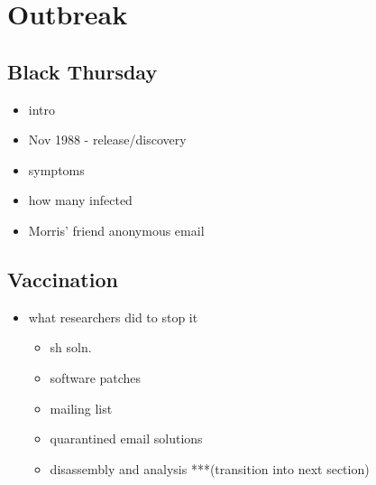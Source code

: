 \section*{Outbreak}

\subsection*{Black Thursday}
\begin{itemize}
    \item intro
	\item Nov 1988 - release/discovery \cite{spafford_crisis_1989}
    \item symptoms
    \item how many infected
    \item Morris' friend anonymous email
\end{itemize}


\subsection*{Vaccination}
\begin{itemize}
    \item what researchers did to stop it
    	\begin{itemize}
    	\item sh soln.
        \item software patches
        \item mailing list
        \item quarantined email solutions
        \item disassembly and analysis ***(transition into next section)
    	\end{itemize}
\end{itemize}

